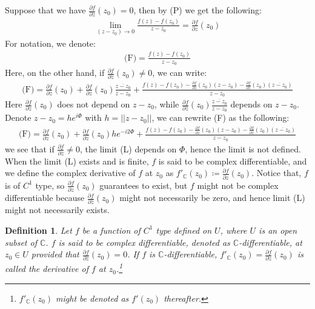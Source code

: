 \documentclass[15pt]{book}
\theoremstyle{break}
\theoremstyle{break}
\newtheorem{defn}{Definition}[corL]
\newcommand{\Complex}{\mathbb{C}}
\newcommand{\pd}{\partial}
\begin{document}
Suppose that we have $\frac{\partial f}{\partial \bar{z}}(z_0) =0$, then by (P) we get the following: 
\begin{align*}
\lim_{(z-z_0)\to 0}\frac{f(z) - f(z_0)}{z-z_0} = \frac{\pd f}{\pd z}(z_0)
\end{align*}
For notation, we denote:
\begin{align*}
\text{(F)} = \frac{f(z)-f(z_0)}{z-z_0}
\end{align*}
Here, on the other hand, if $\frac{\pd f}{\pd \bar{z}}(z_0) \neq 0$, we can write:
\begin{align*}
\text{(F)}=\frac{\pd f}{\pd z}(z_0) + \frac{\pd f}{\pd \bar{z}}(z_0)\frac{\overline{z-z_0}}{z-z_0}+\frac{f(z) - f(z_0) - \frac{\pd f}{\pd z}(z_0)(z-z_0) - \frac{\pd f}{\pd \bar{z}}(z_0)(\overline{z-z_0}) }{z-z_0}  
\end{align*}
Here $\frac{\pd f}{\pd z}(z_0)$ does not depend on $z-z_0$, while $\frac{\pd f}{\pd \bar{z}}(z_0)\frac{\overline{z-z_0}}{z-z_0} $ depends on $z-z_0$.\\ Denote $z-z_0 = he^{i\Phi}$ with $h = ||z-z_0||$, we can rewrite (F) as the following:
\begin{align*}
\text{(F)}=\frac{\pd f}{\pd z}(z_0) + \frac{\pd f}{\pd \bar{z}}(z_0)he^{-i2\Phi} +\frac{f(z) - f(z_0) - \frac{\pd f}{\pd z}(z_0)(z-z_0) - \frac{\pd f}{\pd \bar{z}}(z_0)(\overline{z-z_0}) }{z-z_0} 
\end{align*}
we see that if $\frac{\pd f}{\pd \bar{z}}\neq 0$, the limit (L) depends on $\Phi$, hence the limit is not defined.\\

When the limit (L) exists and is finite, $f$ is said to be complex differentiable, and we define the complex derivative of $f$ at $z_0$ as $f'_{\Complex}(z_0)\coloneqq \frac{\pd f}{\pd z}(z_0)$. Notice that, $f$ is of $C^1$ type, so $\frac{\pd f}{\pd z}(z_0)$ guarantees to exist, but $f$ might not be complex differentiable because $\frac{\partial f}{\partial \bar{z}}(z_0)$ might not necessarily be zero, and hence limit (L) might not necessarily exists. \\

\begin{defn}
Let $f$ be a function of $C^1$ type defined on $U$, where $U$ is an open subset of $\Complex$. $f$ is said to be complex differentiable, denoted as $\Complex$-differentiable, at $z_0\in U$ provided that $\frac{\partial f}{\partial \bar{z}}(z_0)= 0$. If $f$ is $\Complex$-differentiable, $f'_{\Complex}(z_0) = \frac{\pd f}{\pd z}(z_0)$ is called the derivative of $f$ at $z_0$.\footnote{$f'_{\Complex}(z_0)$ might be denoted as $f'(z_0)$ thereafter.}
\end{defn}
\end{document}
